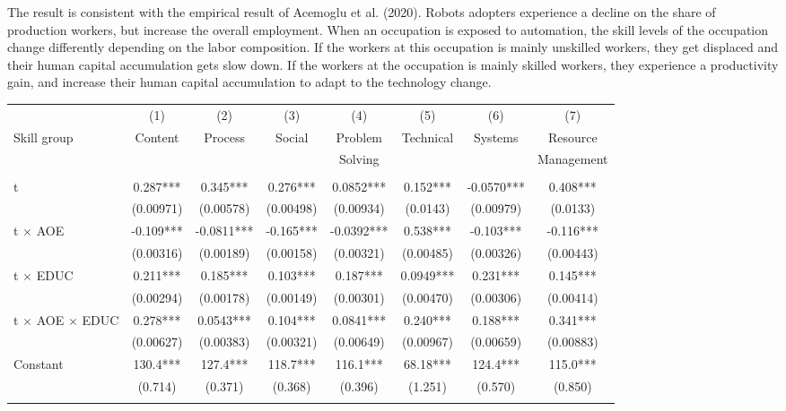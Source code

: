 \documentclass[12pt]{article}
\begin{document}
The result is consistent with the empirical result of Acemoglu et al. (2020)\nocite{Acemogluetal2020}. Robots adopters experience a decline on the share of production workers, but increase the overall employment. When an occupation is exposed to automation, the skill levels of the occupation change differently depending on the labor composition. If the workers at this occupation is mainly unskilled workers, they get displaced and their human capital accumulation gets slow down. If the workers at the occupation is mainly skilled workers, they experience a productivity gain, and increase their human capital accumulation to adapt to the technology change. 
\begin{table}[h!]
\begin{center}
\scriptsize
\begin{tabular}{lccccccc} \hline \hline
 & (1) & (2) & (3) & (4) & (5) & (6) & (7) \\
Skill group & Content & Process & Social & Problem& Technical & Systems & Resource\\ 
 & &  & & Solving &  & & Management \\ \hline
 &  &  &  &  &  &  &  \\
t & 0.287*** & 0.345*** & 0.276*** & 0.0852*** & 0.152*** & -0.0570*** & 0.408*** \\
 & (0.00971) & (0.00578) & (0.00498) & (0.00934) & (0.0143) & (0.00979) & (0.0133) \\
t $\times$ AOE& -0.109*** & -0.0811*** & -0.165*** & -0.0392*** & 0.538*** & -0.103*** & -0.116*** \\
 & (0.00316) & (0.00189) & (0.00158) & (0.00321) & (0.00485) & (0.00326) & (0.00443) \\
t $\times$ EDUC & 0.211*** & 0.185*** & 0.103*** & 0.187*** & 0.0949*** & 0.231*** & 0.145*** \\
 & (0.00294) & (0.00178) & (0.00149) & (0.00301) & (0.00470) & (0.00306) & (0.00414) \\
t $\times$ AOE $\times$ EDUC & 0.278*** & 0.0543*** & 0.104*** & 0.0841*** & 0.240*** & 0.188*** & 0.341*** \\
 & (0.00627) & (0.00383) & (0.00321) & (0.00649) & (0.00967) & (0.00659) & (0.00883) \\
Constant & 130.4*** & 127.4*** & 118.7*** & 116.1*** & 68.18*** & 124.4*** & 115.0*** \\
 & (0.714) & (0.371) & (0.368) & (0.396) & (1.251) & (0.570) & (0.850) \\
 &  &  &  &  &  &  &  \\

\end{tabular}
\end{center}
\end{table}
\end{document}
